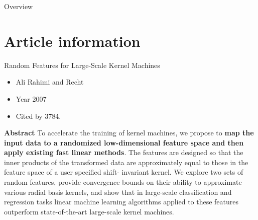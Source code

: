 


\begin{frame}{Overview}
  \tableofcontents
\end{frame}
\section{Article information}
\begin{frame}{Random Features for Large-Scale Kernel Machines}
  \begin{itemize}
    \item Ali Rahimi and Recht
    \item Year 2007
    \item Cited by 3784. 
  \end{itemize}
  \cite{Random_Features_for_Large-Scale_Kernel_Machines}

  \textbf{Abstract}
  To accelerate the training of kernel machines, we propose to \textbf{map the input data to a randomized low-dimensional feature space and then apply existing fast linear methods}. The features are designed so that the inner products of the transformed data are approximately equal to those in the feature space of a user specified shift- invariant kernel. We explore two sets of random features, provide convergence bounds on their ability to approximate various radial basis kernels, and show that in large-scale classification and regression tasks linear machine learning algorithms applied to these features outperform state-of-the-art large-scale kernel machines.
\end{frame}

